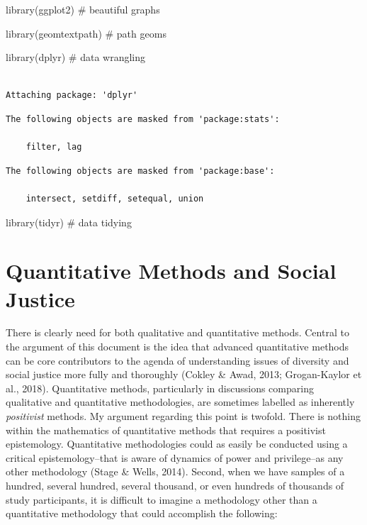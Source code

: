 \documentclass[
  letterpaper,
  DIV=11,
  numbers=noendperiod]{scrreprt}
\newenvironment{Shaded}{\begin{snugshade}}{\end{snugshade}}
\newcommand{\CommentTok}[1]{\textcolor[rgb]{0.37,0.37,0.37}{#1}}
\newcommand{\FunctionTok}[1]{\textcolor[rgb]{0.28,0.35,0.67}{#1}}
\newcommand{\NormalTok}[1]{\textcolor[rgb]{0.00,0.23,0.31}{#1}}
\begin{document}
\begin{Shaded}
\begin{Highlighting}[]
\FunctionTok{library}\NormalTok{(ggplot2) }\CommentTok{\# beautiful graphs}

\FunctionTok{library}\NormalTok{(geomtextpath) }\CommentTok{\# path geoms}

\FunctionTok{library}\NormalTok{(dplyr) }\CommentTok{\# data wrangling}
\end{Highlighting}
\end{Shaded}

\begin{verbatim}

Attaching package: 'dplyr'
\end{verbatim}

\begin{verbatim}
The following objects are masked from 'package:stats':

    filter, lag
\end{verbatim}

\begin{verbatim}
The following objects are masked from 'package:base':

    intersect, setdiff, setequal, union
\end{verbatim}

\begin{Shaded}
\begin{Highlighting}[]
\FunctionTok{library}\NormalTok{(tidyr) }\CommentTok{\# data tidying}
\end{Highlighting}
\end{Shaded}

\hypertarget{quantitative-methods-and-social-justice}{%
\section{Quantitative Methods and Social
Justice}\label{quantitative-methods-and-social-justice}}

There is clearly need for both qualitative and quantitative methods.
Central to the argument of this document is the idea that advanced
quantitative methods can be core contributors to the agenda of
understanding issues of diversity and social justice more fully and
thoroughly (Cokley \& Awad, 2013; Grogan-Kaylor et al., 2018).
Quantitative methods, particularly in discussions comparing qualitative
and quantitative methodologies, are sometimes labelled as inherently
\emph{positivist} methods. My argument regarding this point is twofold.
There is nothing within the mathematics of quantitative methods that
requires a positivist epistemology. Quantitative methodologies could as
easily be conducted using a critical epistemology--that is aware of
dynamics of power and privilege--as any other methodology (Stage \&
Wells, 2014). Second, when we have samples of a hundred, several
hundred, several thousand, or even hundreds of thousands of study
participants, it is difficult to imagine a methodology other than a
quantitative methodology that could accomplish the following:
\end{document}
